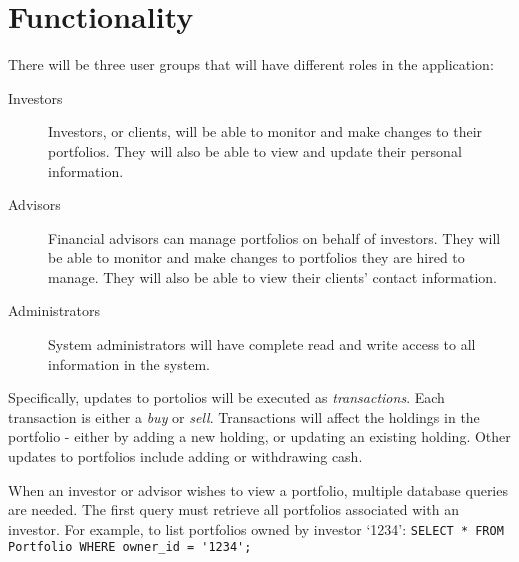 \documentclass[letterpaper]{report}
\begin{document}
\section*{Functionality}
There will be three user groups that will have different roles in the application:
\begin{description}
	\item[Investors] Investors, or clients, will be able to monitor and make changes to their portfolios. They will also be able to view and update their personal information.
	\item[Advisors] Financial advisors can manage portfolios on behalf of investors. They will be able to monitor and make changes to portfolios they are hired to manage. They will also be able to view their clients' contact information.
	\item[Administrators] System administrators will have complete read and write access to all information in the system.
\end{description}

Specifically, updates to portolios will be executed as {\em transactions}. Each transaction is either a {\em buy} or {\em sell}. Transactions will affect the holdings in the portfolio - either by adding a new holding, or updating an existing holding. Other updates to portfolios include adding or withdrawing cash.

When an investor or advisor wishes to view a portfolio, multiple database queries are needed. The first query must retrieve all portfolios associated with an investor. For example, to list portfolios owned by investor `1234': \verb|SELECT * FROM Portfolio WHERE owner_id = '1234';|
\end{document}

